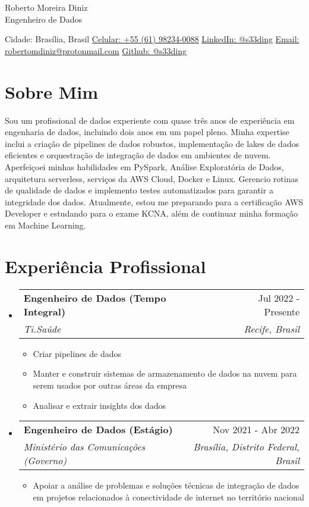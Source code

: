 \documentclass[letterpaper,11pt]{article}%
\makeatletter
\newcommand{\resumeItem}[1]{\item{#1 \vspace{-3pt}}}%
\newcommand{\resumeSubheading}[4]{\vspace{-1pt}\item\begin{tabular*}{0.97\textwidth}[t]{l@{\extracolsep{\fill}}r}\textbf{#1} & #2 \\\textit{\small #3} & \textit{\small #4} \\\end{tabular*}\vspace{-8pt}}%
\newcommand{\resumeSubHeadingListStart}{\begin{itemize}[leftmargin=0.15in, label={}, itemsep=0pt, parsep=0pt]}%
\newcommand{\resumeSubHeadingListEnd}{\end{itemize}}%
\newcommand{\resumeItemListStart}{\begin{itemize}[itemsep=0pt, parsep=0pt]}%
\newcommand{\resumeItemListEnd}{\end{itemize}\vspace{-1pt}}%
\makeatother
\begin{document}
%
\normalsize%
\section*{}%
\label{sec:}%
\begin{center}%
{\LARGE Roberto Moreira Diniz} \\ \vspace{5pt}%
{\large Engenheiro de Dados} \\ \vspace{5pt}%
\end{center}%
\begin{center}%
Cidade: Brasília, Brasil \quad \textbullet \quad \href{https://wa.me/qr/UYOUX2DZ7BYHI1}{Celular: +55 (61) 98234-0088} \quad \textbullet \quad \href{https://www.linkedin.com/in/s33ding/}{LinkedIn: @s33ding} \quad \textbullet \quad \href{mailto:robertomdiniz@protonmail.com}{Email: robertomdiniz@protonmail.com} \quad \textbullet \quad \href{https://github.com/s33ding}{Github: @s33ding}%
\end{center}

%
\section*{Sobre Mim}%
\label{sec:SobreMim}%
Sou um profissional de dados experiente com quase três anos de experiência em engenharia de dados, incluindo dois anos em um papel pleno. Minha expertise inclui a criação de pipelines de dados robustos, implementação de lakes de dados eficientes e orquestração de integração de dados em ambientes de nuvem. Aperfeiçoei minhas habilidades em PySpark, Análise Exploratória de Dados, arquitetura serverless, serviços da AWS Cloud, Docker e Linux. Gerencio rotinas de qualidade de dados e implemento testes automatizados para garantir a integridade dos dados. Atualmente, estou me preparando para a certificação AWS Developer e estudando para o exame KCNA, além de continuar minha formação em Machine Learning.

%
\section*{Experiência Profissional}%
\label{sec:ExperinciaProfissional}%
\resumeSubHeadingListStart%
\resumeSubheading{Engenheiro de Dados (Tempo Integral)}{Jul 2022 - Presente}{Ti.Saúde}{Recife, Brasil}%
\resumeItemListStart%
\resumeItem{Criar pipelines de dados}%
\resumeItem{Manter e construir sistemas de armazenamento de dados na nuvem para serem usados por outras áreas da empresa}%
\resumeItem{Analisar e extrair insights dos dados}%
\resumeItemListEnd%
\resumeSubheading{Engenheiro de Dados (Estágio)}{Nov 2021 - Abr 2022}{Ministério das Comunicações (Governo)}{Brasília, Distrito Federal, Brasil}%
\resumeItemListStart%
\resumeItem{Apoiar a análise de problemas e soluções técnicas de integração de dados em projetos relacionados à conectividade de internet no território nacional}%
\resumeItemListEnd%
\resumeSubHeadingListEnd
\end{document}
